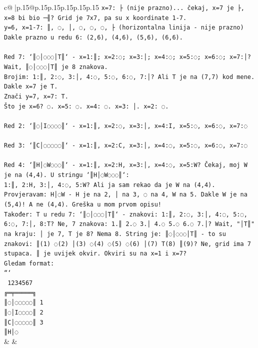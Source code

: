 \documentclass{article}
\begin{document}
{\begin{supertabular}{c@{$\;$}|p{.15\linewidth}@{}p{.15\linewidth}p{.15\linewidth}p{.15\linewidth}p{.15\linewidth}p{.15\linewidth}}
{{{\texttt{x=7: ├ (nije prazno)... čekaj, x=7 je ├, x=8 bi bio ─╢? Grid je 7x7, pa su x koordinate 1{-}7. } \\
\texttt{y=6, x=1{-}7: ║, ◌, │, ◌, ◌, ◌, ├ (horizontalna linija {-} nije prazno)} \\
\texttt{Dakle prazno u redu 6: (2,6), (4,6), (5,6), (6,6).} \\
\\ 
\texttt{Red 7: `║◌│◌◌◌│T║` {-} x=1:║; x=2:◌; x=3:│; x=4:◌; x=5:◌; x=6:◌; x=7:│? Wait, ║◌│◌◌◌│T║ je 8 znakova. } \\
\texttt{Brojim: 1:║, 2:◌, 3:│, 4:◌, 5:◌, 6:◌, 7:│? Ali T je na (7,7) kod mene. Dakle x=7 je T. } \\
\texttt{Znači y=7, x=7: T. } \\
\texttt{Što je x=6? ◌. x=5: ◌. x=4: ◌. x=3: │. x=2: ◌.} \\
\\ 
\texttt{Red 2: `║◌│I◌◌◌◌║` {-} x=1:║, x=2:◌, x=3:│, x=4:I, x=5:◌, x=6:◌, x=7:◌} \\
\\ 
\texttt{Red 3: `║C│◌◌◌◌◌║` {-} x=1:║, x=2:C, x=3:│, x=4:◌, x=5:◌, x=6:◌, x=7:◌} \\
\\ 
\texttt{Red 4: `║H│◌W◌◌◌║` {-} x=1:║, x=2:H, x=3:│, x=4:◌, x=5:W? Čekaj, moj W je na (4,4). U stringu `║H│◌W◌◌◌║`: } \\
\texttt{1:║, 2:H, 3:│, 4:◌, 5:W? Ali ja sam rekao da je W na (4,4). Provjeravam: H│◌W {-} H je na 2, │ na 3, ◌ na 4, W na 5. Dakle W je na (5,4)! A ne (4,4). Greška u mom prvom opisu!} \\
\texttt{Također: T u redu 7: `║◌│◌◌◌│T║` {-} znakovi: 1:║, 2:◌, 3:│, 4:◌, 5:◌, 6:◌, 7:│, 8:T? Ne, 7 znakova: 1.║ 2.◌ 3.│ 4.◌ 5.◌ 6.◌ 7.│? Wait, "│T║" na kraju: │ je 7, T je 8? Nema 8. String je: ║◌│◌◌◌│T║ {-} to su znakovi: ║(1) ◌(2) │(3) ◌(4) ◌(5) ◌(6) │(7) T(8) ║(9)? Ne, grid ima 7 stupaca. ║ je uvijek okvir. Okviri su na x=1 i x=7? } \\
\texttt{Gledam format:} \\
\texttt{```} \\
\texttt{ 1234567} \\
\texttt{╔═╤═════╗} \\
\texttt{║◌│◌◌◌◌◌║ 1} \\
\texttt{║◌│I◌◌◌◌║ 2} \\
\texttt{║C│◌◌◌◌◌║ 3} \\
\texttt{║H│◌} \\
            }
        }
    }
    & & \\ \\


\end{supertabular}}
\end{document}
